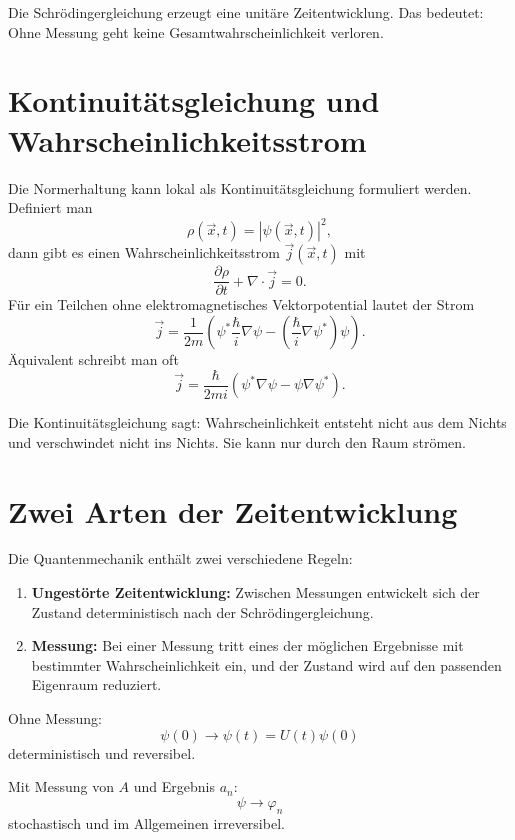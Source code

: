 \begin{conceptbox}
Die Schrödingergleichung erzeugt eine unitäre Zeitentwicklung. Das bedeutet: Ohne Messung geht keine Gesamtwahrscheinlichkeit verloren.
\end{conceptbox}

\section{Kontinuitätsgleichung und Wahrscheinlichkeitsstrom}

Die Normerhaltung kann lokal als Kontinuitätsgleichung formuliert werden. Definiert man
\[
    \rho(\vec{x},t)=|\psi(\vec{x},t)|^2,
\]
dann gibt es einen Wahrscheinlichkeitsstrom $\vec{j}(\vec{x},t)$ mit
\[
    \frac{\partial \rho}{\partial t}+\nabla\cdot\vec{j}=0.
\]
Für ein Teilchen ohne elektromagnetisches Vektorpotential lautet der Strom
\[
    \vec{j}
    =\frac{1}{2m}\left(
        \psi^*\frac{\hbar}{i}\nabla\psi
        -\left(\frac{\hbar}{i}\nabla\psi^*\right)\psi
    \right).
\]
Äquivalent schreibt man oft
\[
    \vec{j}=\frac{\hbar}{2mi}\left(\psi^*\nabla\psi-\psi\nabla\psi^*\right).
\]

\begin{conceptbox}
Die Kontinuitätsgleichung sagt: Wahrscheinlichkeit entsteht nicht aus dem Nichts und verschwindet nicht ins Nichts. Sie kann nur durch den Raum strömen.
\end{conceptbox}

\section{Zwei Arten der Zeitentwicklung}

Die Quantenmechanik enthält zwei verschiedene Regeln:

\begin{enumerate}
    \item \textbf{Ungestörte Zeitentwicklung:} Zwischen Messungen entwickelt sich der Zustand deterministisch nach der Schrödingergleichung.
    \item \textbf{Messung:} Bei einer Messung tritt eines der möglichen Ergebnisse mit bestimmter Wahrscheinlichkeit ein, und der Zustand wird auf den passenden Eigenraum reduziert.
\end{enumerate}

\begin{conceptbox}
Ohne Messung:
\[
    \psi(0)\longrightarrow \psi(t)=U(t)\psi(0)
\]
deterministisch und reversibel.

Mit Messung von $A$ und Ergebnis $a_n$:
\[
    \psi\longrightarrow \varphi_n
\]
stochastisch und im Allgemeinen irreversibel.
\end{conceptbox}

